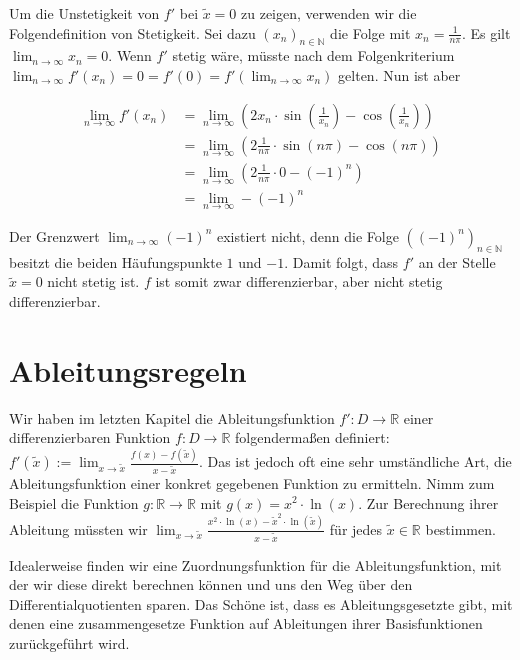 \documentclass[fontsize=9pt,
               parskip=half-,
               DIV=14,
               listof=chapterentry,
               tocflat]{scrbook}
\begin{document}
\begin{example*}
Um die Unstetigkeit von $f'$ bei ${\tilde {x}}=0$ zu zeigen, verwenden wir die Folgendefinition von Stetigkeit. Sei dazu $(x_{n})_{n\in \mathbb {N} }$ die Folge mit $x_{n}={\tfrac {1}{n\pi }}$. Es gilt $\lim _{n\to \infty }x_{n}=0$. Wenn $f'$ stetig wäre, müsste nach dem Folgenkriterium $\lim _{n\to \infty }f'(x_{n})=0=f'(0)=f'\left(\lim _{n\to \infty }x_{n}\right)$ gelten. Nun ist aber

\begin{align*}
\lim _{n\to \infty }f'(x_{n})&=\lim _{n\to \infty }\left(2x_{n}\cdot \sin \left({\frac {1}{x_{n}}}\right)-\cos \left({\frac {1}{x_{n}}}\right)\right)\\[0.3em]&=\lim _{n\to \infty }\left(2{\frac {1}{n\pi }}\cdot \sin(n\pi )-\cos(n\pi )\right)\\[0.3em]&=\lim _{n\to \infty }\left(2{\frac {1}{n\pi }}\cdot 0-(-1)^{n}\right)\\[0.3em]&=\lim _{n\to \infty }-(-1)^{n}
\end{align*}

Der Grenzwert $\lim _{n\to \infty }(-1)^{n}$ existiert nicht, denn die Folge $\left((-1)^{n}\right)_{n\in \mathbb {N} }$ besitzt die beiden Häufungspunkte $1$ und $-1$. Damit folgt, dass $f'$ an der Stelle ${\tilde {x}}=0$ nicht stetig ist. $f$ ist somit zwar differenzierbar, aber nicht stetig differenzierbar.

\end{example*}

\chapter{Ableitungsregeln}

Wir haben im letzten Kapitel die Ableitungsfunktion $f':D\to \mathbb {R} $ einer differenzierbaren Funktion $f:D\to \mathbb {R} $ folgendermaßen definiert: $f'({\tilde {x}}):=\lim _{x\rightarrow {\tilde {x}}}{\tfrac {f(x)-f({\tilde {x}})}{x-{\tilde {x}}}}$. Das ist jedoch oft eine sehr umständliche Art, die Ableitungsfunktion einer konkret gegebenen Funktion zu ermitteln. Nimm zum Beispiel die Funktion $g:\mathbb {R} \to \mathbb {R} $ mit $g(x)=x^{2}\cdot \ln(x)$. Zur Berechnung ihrer Ableitung müssten wir $\lim _{x\rightarrow {\tilde {x}}}{\tfrac {x^{2}\cdot \ln(x)-{\tilde {x}}^{2}\cdot \ln({\tilde {x}})}{x-{\tilde {x}}}}$ für jedes ${\tilde {x}}\in \mathbb {R} $ bestimmen.

Idealerweise finden wir eine Zuordnungsfunktion für die Ableitungsfunktion, mit der wir diese direkt berechnen können und uns den Weg über den Differentialquotienten sparen. Das Schöne ist, dass es Ableitungsgesetzte gibt, mit denen eine zusammengesetze Funktion auf Ableitungen ihrer Basisfunktionen zurückgeführt wird.
\end{document}

